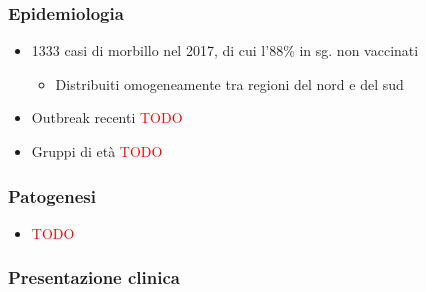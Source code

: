 \documentclass[italian,]{article}
\providecommand{\tightlist}{%
  \setlength{\itemsep}{0pt}\setlength{\parskip}{0pt}}
\newcommand{\TODO}[1]{\textcolor{red}{\textsf{\footnotesize{TODO #1}}}} %
\begin{document}
\hypertarget{epidemiologia-3}{%
\subsubsection{Epidemiologia}\label{epidemiologia-3}}

\begin{itemize}
\tightlist
\item
  1333 casi di morbillo nel 2017, di cui l'88\% in sg. non vaccinati

  \begin{itemize}
  \tightlist
  \item
    Distribuiti omogeneamente tra regioni del nord e del sud
  \end{itemize}
\item
  Outbreak recenti \TODO{}
\item
  Gruppi di età \TODO{}
\end{itemize}

\hypertarget{patogenesi-9}{%
\subsubsection{Patogenesi}\label{patogenesi-9}}

\begin{itemize}
\item
  \TODO{}
\end{itemize}

\hypertarget{presentazione-clinica-2}{%
\subsubsection{Presentazione clinica}\label{presentazione-clinica-2}}
\end{document}

